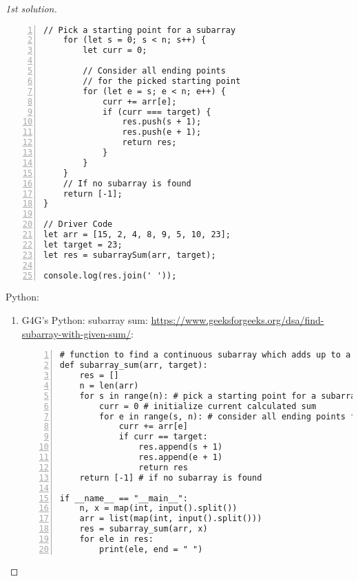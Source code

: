 \documentclass{article}
\begin{document}
\begin{proof}[1st solution]
\begin{Verbatim}[numbers=left,xleftmargin=5mm]
    // Pick a starting point for a subarray
    for (let s = 0; s < n; s++) {
        let curr = 0;

        // Consider all ending points
        // for the picked starting point
        for (let e = s; e < n; e++) {
            curr += arr[e];
            if (curr === target) {
                res.push(s + 1);
                res.push(e + 1);
                return res;
            }
        }
    }
    // If no subarray is found
    return [-1];
}

// Driver Code
let arr = [15, 2, 4, 8, 9, 5, 10, 23];
let target = 23;
let res = subarraySum(arr, target);

console.log(res.join(' '));
    \end{Verbatim}
    Python:
    \begin{enumerate}
        \item G4G's Python: subarray sum: \url{https://www.geeksforgeeks.org/dsa/find-subarray-with-given-sum/}:
        \begin{Verbatim}[numbers=left,xleftmargin=5mm]
# function to find a continuous subarray which adds up to a given number
def subarray_sum(arr, target):
    res = []
    n = len(arr)
    for s in range(n): # pick a starting point for a subarray
        curr = 0 # initialize current calculated sum
        for e in range(s, n): # consider all ending points for the picked starting point
            curr += arr[e]
            if curr == target:
                res.append(s + 1)
                res.append(e + 1)
                return res
    return [-1] # if no subarray is found

if __name__ == "__main__":
    n, x = map(int, input().split())
    arr = list(map(int, input().split()))
    res = subarray_sum(arr, x)
    for ele in res:
        print(ele, end = " ")
        \end{Verbatim}
    \end{enumerate}
\end{proof}
\end{document}
